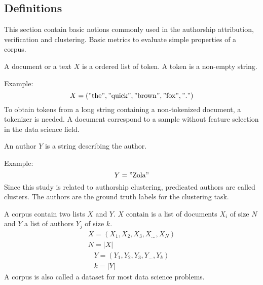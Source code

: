 \subsection{Definitions \label{sec:basic_notions}}

This section contain basic notions commonly used in the authorship attribution, verification and clustering.
Basic metrics to evaluate simple properties of a corpus.

\begin{definition}
  A document or a text $X$ is a ordered list of token.
  A token is a non-empty string.

  Example:
  \begin{equation}
    X = ("\text{the}", "\text{quick}", "\text{brown}", "\text{fox}", "\text{.}")
  \end{equation}
  To obtain tokens from a long string containing a non-tokenized document, a tokenizer is needed.
  A document correspond to a sample without feature selection in the data science field.
\end{definition}

\begin{definition}[Author]
  An author $Y$ is a string describing the author.

  Example:
  \begin{equation}
    Y = "\text{Zola}"
  \end{equation}
  Since this study is related to authorship clustering, predicated authors are called clusters.
  The authors are the ground truth labels for the clustering task.
\end{definition}

\begin{definition}[Corpus]
  A corpus contain two lists $X$ and $Y$.
  $X$ contain is a list of documents $X_i$ of size $N$ and $Y$ a list of authors $Y_j$ of size $k$.
  \begin{gather}
    X = (X_1, X_2, X_3, X_{...}, X_N) \\
    N = |X|
  \end{gather}
  \begin{gather}
    Y = (Y_1, Y_2, Y_3, Y_{...}, Y_k) \\
    k = |Y|
  \end{gather}
  A corpus is also called a dataset for most data science problems.
\end{definition}

